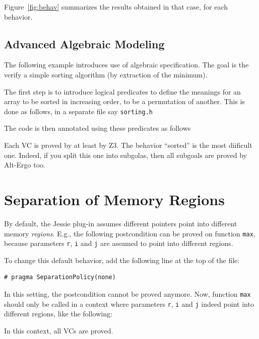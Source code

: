 \documentclass[a4paper,11pt,twoside,openright]{report}
\begin{document}


Figure~\ref{fig:behav} summarizes the results obtained in that case,
for each behavior.

\section{Advanced Algebraic Modeling}

The following example introduces use of algebraic specification. The
goal is the verify a simple sorting algorithm (by extraction of the
minimum).

The first step is to introduce logical predicates to define the
meanings for an array to be sorted in increasing order, to be a
permutation of another. This is done as follows, in a separate file
say \texttt{sorting.h}



The code is then annotated using these predicates as follows



Each VC is proved by at least by Z3. The behavior ``sorted'' is the
most diificult one. Indeed, if you split this one into subgolas, then
all subgoals are proved by Alt-Ergo too.

\chapter{Separation of Memory Regions}

By default, the Jessie plug-in assumes different pointers point into
different memory \textit{regions}.  E.g., the following postcondition
can be proved on function \verb|max|, because parameters \verb|r|,
\verb|i| and \verb|j| are assumed to point into different regions.



To change this default behavior, add the following line at the top of the file:
\begin{verbatim}
# pragma SeparationPolicy(none)
\end{verbatim}

In this setting, the postcondition cannot be proved anymore.
Now, function \verb|max| should only be called in a context where
parameters \verb|r|, \verb|i| and \verb|j| indeed point into
different regions, like the following:



In this context, all VCs are proved.
\end{document}
